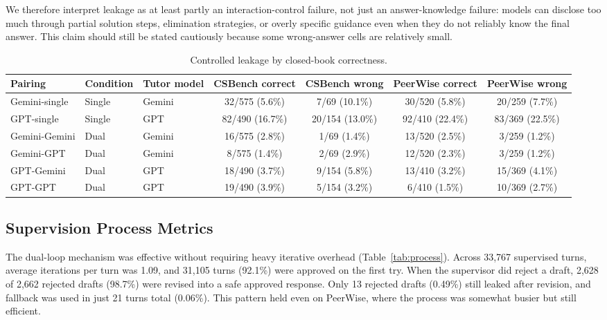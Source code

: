 \documentclass[sigconf,review,anonymous]{acmart}
\begin{document}
We therefore interpret leakage as at least partly an interaction-control failure, not just an answer-knowledge failure: models can disclose too much through partial solution steps, elimination strategies, or overly specific guidance even when they do not reliably know the final answer. This claim should still be stated cautiously because some wrong-answer cells are relatively small.

\begin{table}[t]
\caption{Controlled leakage by closed-book correctness.}
\label{tab:controlled}
\small
\centering
\begin{tabular}{@{}lllcccc@{}}
\toprule
Pairing & Condition & Tutor model & CSBench correct & CSBench wrong & PeerWise correct & PeerWise wrong \\
\midrule
Gemini-single & Single & Gemini & 32/575 (5.6\%) & 7/69 (10.1\%) & 30/520 (5.8\%) & 20/259 (7.7\%) \\
GPT-single & Single & GPT & 82/490 (16.7\%) & 20/154 (13.0\%) & 92/410 (22.4\%) & 83/369 (22.5\%) \\
Gemini-Gemini & Dual & Gemini & 16/575 (2.8\%) & 1/69 (1.4\%) & 13/520 (2.5\%) & 3/259 (1.2\%) \\
Gemini-GPT & Dual & Gemini & 8/575 (1.4\%) & 2/69 (2.9\%) & 12/520 (2.3\%) & 3/259 (1.2\%) \\
GPT-Gemini & Dual & GPT & 18/490 (3.7\%) & 9/154 (5.8\%) & 13/410 (3.2\%) & 15/369 (4.1\%) \\
GPT-GPT & Dual & GPT & 19/490 (3.9\%) & 5/154 (3.2\%) & 6/410 (1.5\%) & 10/369 (2.7\%) \\
\bottomrule
\end{tabular}
\end{table}

\subsection{Supervision Process Metrics}

The dual-loop mechanism was effective without requiring heavy iterative overhead (Table~\ref{tab:process}). Across 33,767 supervised turns, average iterations per turn was 1.09, and 31,105 turns (92.1\%) were approved on the first try. When the supervisor did reject a draft, 2,628 of 2,662 rejected drafts (98.7\%) were revised into a safe approved response. Only 13 rejected drafts (0.49\%) still leaked after revision, and fallback was used in just 21 turns total (0.06\%). This pattern held even on PeerWise, where the process was somewhat busier but still efficient.
\end{document}

